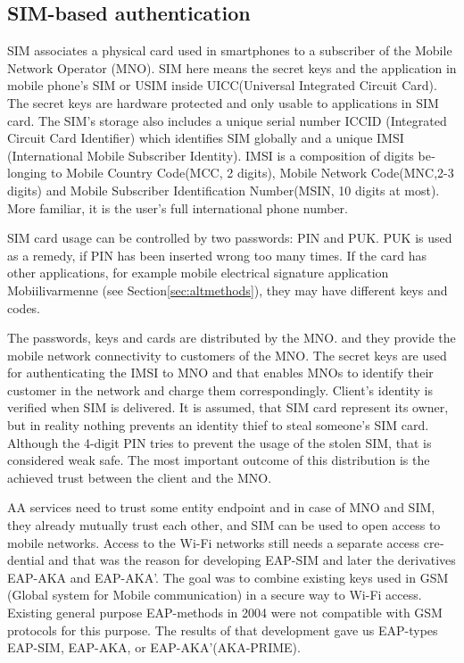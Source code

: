 \documentclass[12pt,a4paper,english]{tutthesis}
\begin{document}
\begin{otherlanguage}{english}
\section{SIM-based authentication}
\label{sec-2-5}
\label{sec:sim-based-auth}
SIM associates a physical card used in smartphones to
a subscriber of the Mobile Network Operator (MNO).
SIM here means the secret keys and the application in mobile phone's
SIM or USIM inside UICC(Universal Integrated Circuit Card).
The secret keys are hardware protected and only usable to applications
in SIM card.
The SIM's storage also includes a unique serial number ICCID 
(Integrated Circuit Card Identifier) which identifies SIM globally
and a unique IMSI (International Mobile Subscriber Identity). IMSI is
a composition of digits belonging to Mobile Country Code(MCC, 2
digits), Mobile Network Code(MNC,2-3 digits) and Mobile Subscriber
Identification Number(MSIN, 10 digits at most).
More familiar, it is the user's full international phone number.


SIM card usage can be controlled by two passwords: PIN and PUK.  PUK
is used as a remedy, if PIN has been inserted wrong too many times.
If the card has other applications, for example mobile electrical
signature application Mobiilivarmenne (see Section\ref{sec:altmethods}),
they may have different keys and codes.


The passwords, keys and cards are distributed by the MNO.
 and they 
provide the mobile network connectivity to customers of the MNO.  The
secret keys are used for authenticating the IMSI to MNO and that
enables MNOs to identify their customer in the network and charge them
correspondingly.  Client's identity is verified when SIM is delivered.
It is assumed, that SIM card represent its owner, but in reality
nothing prevents an identity thief to steal someone's SIM
card. Although the 4-digit PIN tries to prevent the usage of the
stolen SIM, that is considered weak safe\cite[p.31]{aaa-nakhjiri2005}.
The most important outcome of this distribution is the achieved trust
between the client and the MNO.


AA services need to trust some entity endpoint and in case of MNO and
SIM, they already mutually trust each other, and SIM can be used 
to open access to mobile networks.
Access to the Wi-Fi networks still needs a separate access credential
and that was the reason for developing EAP-SIM and later the
derivatives EAP-AKA and EAP-AKA'.  The goal was to combine 
existing keys used in  GSM (Global system for Mobile communication)
in a secure way to Wi-Fi access. Existing general purpose EAP-methods in 2004 were not
compatible with GSM protocols for this purpose.\cite[p.93]{hav-doc}
The results of that development gave us EAP-types EAP-SIM, EAP-AKA, or
EAP-AKA'(AKA-PRIME).


\end{otherlanguage}
\end{document}
